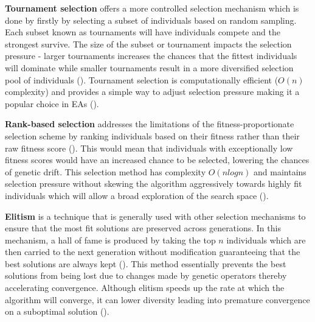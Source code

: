 \parbreak\noindent \textbf{Tournament selection} offers a more controlled selection mechanism which is done by firstly by selecting a subset of individuals based on random sampling. Each subset known as tournaments will have individuals compete and the strongest survive. The size of the subset or tournament impacts the selection pressure - larger tournaments increases the chances that the fittest individuals will dominate while smaller tournaments result in a more diversified selection pool of individuals (\cite{shukla2015comparative}). Tournament selection is computationally efficient ($O(n)$ complexity) and provides a simple way to adjust selection pressure making it a popular choice in EAs (\cite{shukla2015comparative}).

\parbreak\noindent \textbf{Rank-based selection} addresses the limitations of the fitness-proportionate selection scheme by ranking individuals based on their fitness rather than their raw fitness score (\cite{mitchell1998introduction}). This would mean that individuals with exceptionally low fitness scores would have an increased chance to be selected, lowering the chances of genetic drift. This selection method has complexity $O(n log n)$ and maintains selection pressure without skewing the algorithm aggressively towards highly fit individuals which will allow a broad exploration of the search space (\cite{mitchell1998introduction}).

\parbreak\noindent \textbf{Elitism} is a technique that is generally used with other selection mechanisms to ensure that the most fit solutions are preserved across generations. In this mechanism, a hall of fame is produced by taking the top $n$ individuals which are then carried to the next generation without modification guaranteeing that the best solutions are always kept (\cite{mitchell1998introduction}). This method essentially prevents the best solutions from being lost due to changes made by genetic operators thereby accelerating convergence. Although elitism speeds up the rate at which the algorithm will converge, it can lower diversity leading into premature convergence on a suboptimal solution (\cite{malik2014preventing}).

